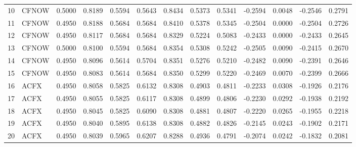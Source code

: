 \begin{tabular}{rlrrrrrrrrrrr}
    10 &  CFNOW &  0.5000 &          0.8189 &  0.5594 &            0.5643 &          0.8434 &     0.5373 &      0.5341 &          -0.2594 &         0.0048 &    -0.2546 &                          0.2791 \\
    11 &  CFNOW &  0.4950 &          0.8188 &  0.5684 &            0.5684 &          0.8410 &     0.5378 &      0.5345 &          -0.2504 &         0.0000 &    -0.2504 &                          0.2726 \\
    12 &  CFNOW &  0.4950 &          0.8117 &  0.5684 &            0.5684 &          0.8329 &     0.5224 &      0.5083 &          -0.2433 &         0.0000 &    -0.2433 &                          0.2645 \\
    13 &  CFNOW &  0.5000 &          0.8100 &  0.5594 &            0.5684 &          0.8354 &     0.5308 &      0.5242 &          -0.2505 &         0.0090 &    -0.2415 &                          0.2670 \\
    14 &  CFNOW &  0.4950 &          0.8096 &  0.5614 &            0.5704 &          0.8351 &     0.5276 &      0.5210 &          -0.2482 &         0.0090 &    -0.2391 &                          0.2646 \\
    15 &  CFNOW &  0.4950 &          0.8083 &  0.5614 &            0.5684 &          0.8350 &     0.5299 &      0.5220 &          -0.2469 &         0.0070 &    -0.2399 &                          0.2666 \\
    16 &   ACFX &  0.4950 &          0.8058 &  0.5825 &            0.6132 &          0.8308 &     0.4903 &      0.4811 &          -0.2233 &         0.0308 &    -0.1926 &                          0.2176 \\
    17 &   ACFX &  0.4950 &          0.8055 &  0.5825 &            0.6117 &          0.8308 &     0.4899 &      0.4806 &          -0.2230 &         0.0292 &    -0.1938 &                          0.2192 \\
    18 &   ACFX &  0.4950 &          0.8045 &  0.5825 &            0.6090 &          0.8308 &     0.4881 &      0.4807 &          -0.2220 &         0.0265 &    -0.1955 &                          0.2218 \\
    19 &   ACFX &  0.4950 &          0.8040 &  0.5895 &            0.6138 &          0.8308 &     0.4882 &      0.4826 &          -0.2145 &         0.0243 &    -0.1902 &                          0.2171 \\
    20 &   ACFX &  0.4950 &          0.8039 &  0.5965 &            0.6207 &          0.8288 &     0.4936 &      0.4791 &          -0.2074 &         0.0242 &    -0.1832 &                          0.2081 \\

\end{tabular}
